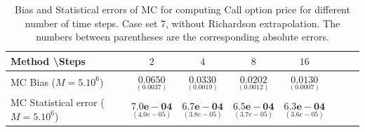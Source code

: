 \documentclass[11pt]{article}
\begin{document}
\begin{table}[h!]
	\centering
	\begin{tabular}{l*{6}{c}r}
		Method \textbackslash  Steps            & $2$ & $4$ & $8$ & $16$  \\
		\hline
		MC Bias ($M=5.10^6$)   & 	$ \underset{(0.0037
			)}{\mathbf{0.0650}}$  & $\underset{(0.0019)}{\mathbf{0.0330
		}}$  & $\underset{(0.0012)}{\mathbf{0.0202}}$ & $\underset{(0.0007)}{\mathbf{0.0130}}$\\ 
		
		MC Statistical error ($M=5.10^6$)  &  $\underset{(   4.0e-05)} {\mathbf{7.0e-04}}$  & $\underset{(3.8e-05)} {\mathbf{6.7e-04}}$  & $\underset{(3.7e-05)} {\mathbf{6.5e-04 }}$ & $\underset{(3.6e-05)} {\mathbf{6.3e-04}}$	\\
		
		\hline
	\end{tabular}
	\caption{Bias and Statistical errors of MC   for computing Call option price  for different number of time steps. Case set 7, without Richardson extrapolation. The numbers between parentheses are the corresponding absolute errors.}
	\label{Bias and Statistical errors of MC ($M=5.10^6$)  for computing Call option price  for different number of time steps. Case set 7, without Richardson extrapolation. The numbers between parentheses are the corresponding absolute errors.}
\end{table}
%
%
%
\end{document}
